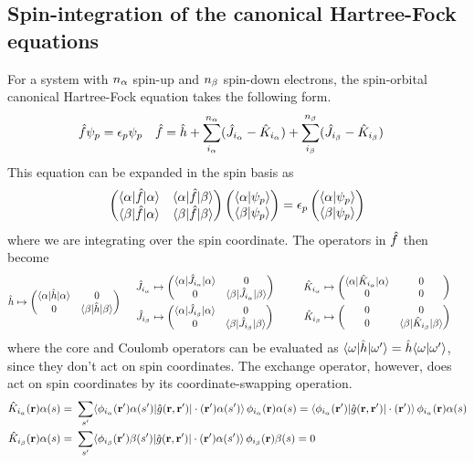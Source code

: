 \documentclass[11pt]{article}
\numberwithin{equation}{section}
\begin{document}
\subsection{Spin-integration of the canonical Hartree-Fock equations}

For a system with $n_{\alpha }$ spin-up and $n_{\beta }$ spin-down electrons, the spin-orbital canonical Hartree-Fock equation takes the following form.
\begin{align}\label{eq:canonical-hf}
&
  \hat{f}\psi _p
=
  \epsilon _p\psi _p
&&
  \hat{f}
=
  \hat{h}
+
  \sum_{i_{\alpha }}^{n_{\alpha }}
  (\hat{J}_{i_{\alpha }}-\hat{K}_{i_{\alpha }})
+
  \sum_{i_{\beta }}^{n_{\beta }}
  (\hat{J}_{i_{\beta }}-\hat{K}_{i_{\beta }})
\end{align}
This equation can be expanded in the spin basis as
\begin{align*}
  \ma{
    \ip{\a|\op{f}|\a}&\ip{\a|\op{f}|\b}\\
    \ip{\b|\op{f}|\a}&\ip{\b|\op{f}|\b}}
  \ma{
    \ip{\a|\y_p}\\
    \ip{\b|\y_p}}
=
  \ev_p
  \ma{
    \ip{\a|\y_p}\\
    \ip{\b|\y_p}}
\end{align*}
where we are integrating over the spin coordinate.
The operators in $\hat{f}$ then become
\begin{align*}
&
  \op{h}
\mapsto
  \ma{
    \ip{\a|\op{h}|\a}&0\\
    0&\ip{\b|\op{h}|\b}}
&&
\begin{array}{r@{\ }l@{\hspace{1cm}}r@{\ }l}
  \op{J}_{i_\a}
&\mapsto
  \ma{
    \ip{\a|\op{J}_{i_\a}|\a}&0\\
    0&\ip{\b|\op{J}_{i_\a}|\b}}
&
  \op{K}_{i_\a}
&\mapsto
  \ma{
    \ip{\a|\op{K}_{i_\a}|\a}&0\\
    0&\makebox[\widthof{\ip{\b|\op{K}_{i_\b}|\b}}]{0}}
\\[10pt]
  \op{J}_{i_\b}
&\mapsto
  \ma{
    \ip{\a|\op{J}_{i_\b}|\a}&0\\
    0&\ip{\b|\op{J}_{i_\b}|\b}}
&
  \op{K}_{i_\b}
&\mapsto
  \ma{
    \makebox[\widthof{\ip{\a|\op{K}_{i_\a}|\a}}]{0}&0\\
    0&\ip{\b|\op{K}_{i_\b}|\b}}
\end{array}
\end{align*}
where the core and Coulomb operators can be evaluated as $\langle\omega |\hat{h}|\omega '\rangle=\hat{h}\langle\omega |\omega '\rangle$, since they don't act on spin coordinates.
The exchange operator, however, does act on spin coordinates by its coordinate-swapping operation.
\begin{align*}
  \hat{K}_{i_{\alpha }}(\mathbf{r})\alpha (s)
=&\
  \sum_{s'}
  \langle\phi _{i_{\alpha }}(\mathbf{r}')\alpha (s')|\hat{g}(\mathbf{r},\mathbf{r}')|\cdot(\mathbf{r}')\alpha (s')\rangle\,
  \phi _{i_{\alpha }}(\mathbf{r})\alpha (s)
=
  \langle\phi _{i_{\alpha }}(\mathbf{r}')|\hat{g}(\mathbf{r},\mathbf{r}')|\cdot(\mathbf{r}')\rangle\,
  \phi _{i_{\alpha }}(\mathbf{r})\alpha (s)
\\
  \hat{K}_{i_{\beta }}(\mathbf{r})\alpha (s)
=&\
  \sum_{s'}
  \langle\phi _{i_{\beta }}(\mathbf{r}')\beta (s')|\hat{g}(\mathbf{r},\mathbf{r}')|\cdot(\mathbf{r}')\alpha (s')\rangle\,
  \phi _{i_{\beta }}(\mathbf{r})\beta (s)
=
  0
\end{align*}
\end{document}
